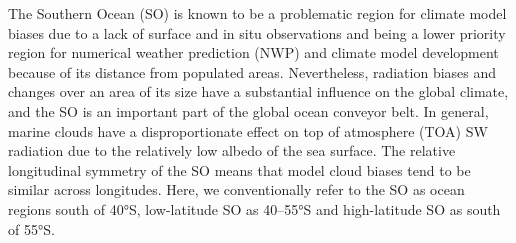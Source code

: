 \documentclass[12pt,a4paper]{article}
\begin{document}
The Southern Ocean (SO) is known to be a problematic region for climate model
biases due to a lack of surface and in situ observations and being a lower
priority region for numerical weather prediction (NWP) and climate model
development because of its distance from populated areas.  Nevertheless,
radiation biases and changes over an area of its size have a substantial
influence on the global climate, and the SO is an important part of the global
ocean conveyor belt. In general, marine clouds have a disproportionate effect on top of
atmosphere (TOA) SW radiation due to the relatively low albedo of the sea
surface.  The relative longitudinal symmetry of the SO means that model cloud
biases tend to be similar across longitudes.  Here, we conventionally refer to
the SO as ocean regions south of 40°S, low-latitude SO as 40--55°S and
high-latitude SO as south of 55°S.
\end{document}
